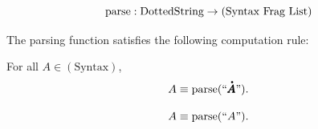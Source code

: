 \begin{metadefinition}
\[
{\text{parse}} : {\text{DottedString}} \to (\text{Syntax Frag List})
\]
\end{metadefinition}
The parsing function satisfies the following computation rule:\\
\begin{metainferencerule}
For all $A\in(\text{Syntax})$,
\[
A \equiv \myparse(\myquote{\meta{\pmb{A}}}).
\]

\[
A \equiv \myparse(\myquote{A}).
\]
\end{metainferencerule}

